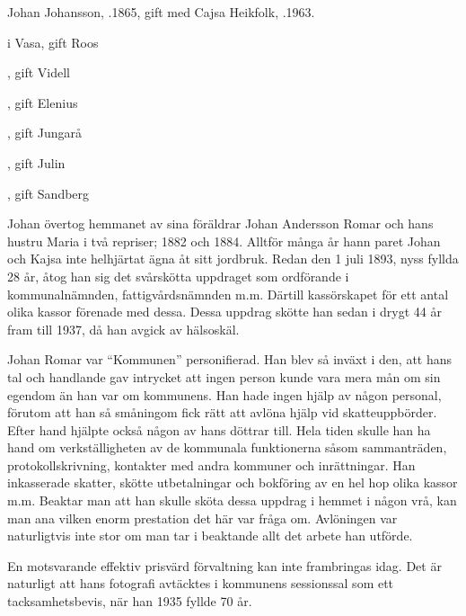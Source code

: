 Johan Johansson, .1865, gift med Cajsa Heikfolk, .1963.
\begin{jhchildren}
  \item {} i Vasa, gift Roos
  \item {}, gift Videll
  \item {}, gift Elenius
  \item {}, gift Jungarå
  \item {}
  \item {}, gift Julin
  \item {}, gift Sandberg
\end{jhchildren}
Johan övertog hemmanet av sina föräldrar Johan Andersson Romar och hans hustru Maria i två repriser;  1882 och 1884. Alltför många år hann paret Johan och Kajsa inte helhjärtat ägna åt sitt jordbruk. Redan den 1 juli 1893, nyss fyllda 28 år, åtog han sig det svårskötta uppdraget som ordförande i kommunalnämnden, fattigvårdsnämnden m.m. Därtill kassörskapet för ett antal olika kassor förenade med dessa. Dessa uppdrag skötte han sedan i drygt 44 år fram till 1937, då han avgick av hälsoskäl.

Johan Romar var ``Kommunen'' personifierad. Han blev så inväxt i den, att hans tal och handlande gav intrycket att ingen person kunde vara mera mån om sin egendom än han var om kommunens. Han hade ingen hjälp av någon personal, förutom  att han så småningom fick rätt att avlöna hjälp vid skatteuppbörder. Efter hand hjälpte också någon av hans döttrar till. Hela tiden skulle han ha hand om verkställigheten av de kommunala funktionerna såsom sammanträden, protokollskrivning, kontakter med andra kommuner och inrättningar. Han inkasserade skatter, skötte utbetalningar och bokföring av en hel hop olika kassor m.m. Beaktar man att han skulle sköta dessa uppdrag i hemmet i någon vrå, kan man ana vilken enorm prestation det här var fråga om. Avlöningen var naturligtvis inte stor om man tar i beaktande allt det arbete han utförde.

En motsvarande effektiv prisvärd förvaltning kan inte frambringas idag. Det är naturligt att hans fotografi avtäcktes i kommunens sessionssal som ett tacksamhetsbevis, när han 1935 fyllde 70 år.

